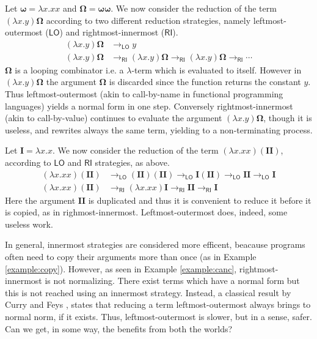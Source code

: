 \documentclass[english]{llncs}
\newcommand{\redlo}{\longrightarrow_\pslo}
\newcommand{\redri}{\longrightarrow_\psri}
\newcommand{\pslo}{\mathsf{LO}}
\newcommand{\psri}{\mathsf{RI}}
\begin{document}
\begin{example}\label{example:canc}
	Let $\bm{\omega}=\lambda x.xx$ and $\bm{\Omega}=\bm{\omega\omega}$. We now consider the reduction of the term $(\lambda x.y)\bm{\Omega}$ according to two different reduction strategies, namely leftmost-outermost ($\pslo$) and rightmost-innermost ($\psri$).
	\begin{align*}
		(\lambda x.y)\bm{\Omega}&\redlo y\\
		(\lambda x.y)\bm{\Omega}&\redri(\lambda x.y)\bm{\Omega}\redri(\lambda x.y)\bm{\Omega}\redri\cdots
	\end{align*}
	$\bm{\Omega}$ is a looping combinator i.e. a $\lambda$-term which is evaluated to itself. However in $(\lambda x.y)\bm{\Omega}$ the argument $\bm{\Omega}$ is discarded since the function returns the constant $y$. Thus leftmost-outermost (akin to call-by-name in functional programming languages) yields a normal form in one step. Conversely rightmost-innermost (akin to call-by-value) continues to evaluate the argument $(\lambda x.y)\bm{\Omega}$, though it is useless, and rewrites always the same term, yielding to a non-terminating process.
\end{example}
\begin{example}\label{example:copy}
	Let $\bm{I}=\lambda x.x$. We now consider the reduction of the term $(\lambda x.xx)(\bm{II})$, according to $\pslo$ and $\psri$ strategies, as above.
	\begin{align*}
		(\lambda x.xx)(\bm{II})&\redlo (\bm{II})(\bm{II}) \redlo
		\bm{I}(\bm{II}) \redlo \bm{II} \redlo \bm{I}\\
		(\lambda x.xx)(\bm{II})&\redri (\lambda x.xx)\bm{I} \redri \bm{II} \redri \bm{I}
	\end{align*}
	Here the argument $\bm{II}$ is duplicated and thus it is convenient to reduce it before it is copied, as in righmost-innermost. Leftmost-outermost does, indeed, some useless work.
\end{example}
In general, innermost strategies are considered more efficent, beacause programs often need to copy their arguments more than once (as in Example \ref{example:copy}). However, as seen in Example \ref{example:canc}, rightmost-innermost is not normalizing. There exist terms which have a normal form but this is not reached using an innermost strategy. Instead, a classical result by Curry and Feys \cite{curry_combinatory_1958}, states that reducing a term leftmost-outermost always brings to normal norm, if it exists. Thus, leftmost-outermost is slower, but in a sense, safer. Can we get, in some way, the benefits from both the worlds? 
\end{document}
